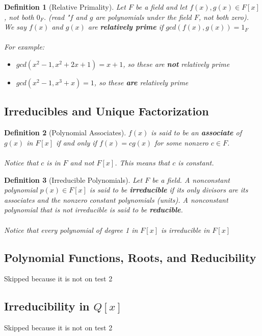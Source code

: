 \documentclass{article}
\theoremstyle{break}
\newtheorem{definition}{Definition}[subsection]
\begin{document}
\begin{definition}[Relative Primality]
  Let $F$ be a field and let $f(x), g(x) \in F[x]$, not both $0_F$. (read "$f$
  and $g$ are polynomials under the field $F$, not both zero). We say $f(x)$
  and $g(x)$ are \textbf{relatively prime} if $gcd(f(x), g(x)) = 1_F$
  \\ \\ For example:
  \begin{itemize}
    \item $gcd(x^2 - 1, x^2 + 2x + 1) = x + 1$, so these are \textbf{not}
    relatively prime 
    \item $gcd(x^2 - 1, x^3 + x) = 1$, so these \textbf{are} relatively prime
  \end{itemize}
\end{definition}

\subsection{Irreducibles and Unique Factorization}

\begin{definition}[Polynomial Associates]
  $f(x)$ is said to be an \textbf{associate} of $g(x)$ in $F[x]$ if and only if
  $f(x) = cg(x)$ for some nonzero $c \in F$.
  \\ \\ Notice that $c$ is in $F$ and not $F[x]$. This means that $c$ is constant.
\end{definition}

\begin{definition}[Irreducible Polynomials]
  Let $F$ be a field. A nonconstant polynomial $p(x) \in F[x]$ is said to be
  \textbf{irreducible} if its only divisors are its associates and the nonzero
  constant polynomials (units). A nonconstant polynomial that is not
  irreducible is said to be \textbf{reducible}.
  \\ \\ Notice that every polynomial of degree 1 in $F[x]$ is irreducible in $F[x]$
\end{definition}

\subsection{Polynomial Functions, Roots, and Reducibility}
Skipped because it is not on test 2

\subsection{Irreducibility in $Q[x]$}
Skipped because it is not on test 2
\end{document}
